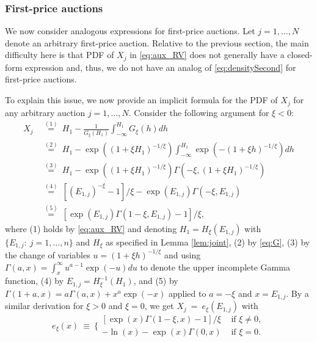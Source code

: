 \subsubsection{First-price auctions}

We now consider analogous expressions for first-price auctions. Let $j=1,\dots,N$ denote an arbitrary first-price auction. Relative to the previous section, the main difficulty here is that PDF of $X_{j}$ in \eqref{eq:aux_RV} does not generally have a closed-form expression and, thus, we do not have an analog of \eqref{eq:densitySecond} for first-price auctions.

To explain this issue, we now provide an implicit formula for the PDF of $X_{j}$ for any arbitrary auction $j=1,\dots,N$. Consider the following argument for $\xi <0$: 
\begin{align}
X_{j}& ~\overset{(1)}{=}~H_{1}-\tfrac{1}{G_{\xi }(H_{1})}\int_{-\infty }^{H_{1}}G_{\xi }(h)dh \nonumber \\
&~\overset{(2)}{=}~H_{1}-\exp ( ( 1+\xi H_{1}) ^{-1/\xi }) \int_{-\infty }^{H_{1}}\exp ( -( 1+\xi h) ^{-1/\xi }) dh \nonumber \\
& ~\overset{(3)}{=}~
H_{1}-\exp ((1+\xi H_{1})^{-1/\xi })\Gamma (-\xi ,(1+\xi H_{1})^{-1/\xi }) \nonumber \\
& ~\overset{(4)}{=}~[{( E_{1,j}) ^{-\xi }-1}]/{\xi }-\exp (E_{1,j})\Gamma (-\xi ,E_{1,j}) \nonumber \\
& ~\overset{(5)}{=}~[{\exp (E_{1,j})\Gamma (1-\xi ,E_{1,j})-1}]/{\xi },\label{eq:Xformula}
\end{align}
where (1) holds by \eqref{eq:aux_RV} and denoting $H_{1}=H_{\xi }(E_{1,j})$ with $\{E_{1,j}:~j=1,\dots ,n\}$ and $H_{\xi }$ as specified in Lemma \ref{lem:joint}, (2) by \eqref{eq:G}, (3) by the change of variables $u=( 1+\xi h) ^{-1/\xi }$ and using $\Gamma (a,x)=\int_{x}^{\infty }u^{a-1}\exp ( -u) du$ to denote the upper incomplete Gamma function, (4) by $E_{1,j}=H_{\xi }^{-1}( H_{1}) $, and (5) by $\Gamma (1+a,x)=a\Gamma (a,x)+x^{a}\exp ( -x) $ 
applied to $a=-\xi $ and $x=E_{1,j}$. By a similar derivation for $\xi>0$ and $\xi=0$, we get $X_{j}~=~e_{\xi }(E_{1,j})$ with
\begin{equation}
    e_{\xi }(x)~\equiv~ \bigg\{
\begin{array}{ll}
[ \exp (x)\Gamma (1-\xi ,x)-1]/\xi& \text{ if }\xi \neq 0, \\
-\ln ( x) -\exp ( x) \Gamma (0,x)& \text{ if }\xi =0.
\end{array}
\label{eq:XdensityAppendix}
\end{equation}
